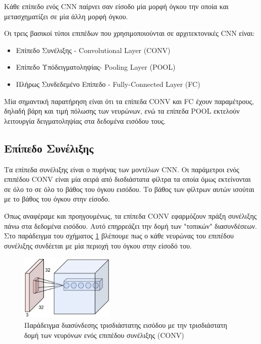 Κάθε επίπεδο ενός CNN παίρνει σαν είσοδο μία μορφή όγκου την οποία
και μετασχηματίζει σε μία άλλη μορφή όγκου.

Οι τρεις βασικοί τύποι επιπέδων που χρησιμοποιούνται σε αρχιτεκτονικές CNN είναι:
\begin{itemize}
  \item{Επίπεδο Συνέλιξης - Convolutional Layer (CONV)}
  \item{Επίπεδο Υπόδειγματοληψίας- Pooling Layer (POOL)}
  \item{Πλήρως Συνδεδεμένο Επίπεδο - Fully-Connected Layer (FC)}
\end{itemize}
Μία σημαντική παρατήρηση είναι ότι τα επίπεδα CONV και FC έχουν παραμέτρους, δηλαδή
βάρη και τιμή πόλωσης των νευρώνων, ενώ τα επίπεδα POOL εκτελούν λειτουργία
δειγματοληψίας στα δεδομένα εισόδου τους.

\subsection{Επίπεδο Συνέλιξης}

Τα επίπεδα συνέλιξης είναι ο πυρήνας των μοντέλων CNN. Οι παράμετροι ενός
επιπέδου CONV είναι μία σειρά από δισδιάστατα φίλτρα τα οποία όμως εκτείνονται
σε όλο το σε όλο το βάθος του όγκου εισόδου. Το βάθος των φίλτρων αυτών
ισούται με το βάθος του όγκου στην είσοδο.

Όπως αναφέραμε και προηγουμένως, τα επίπεδα CONV εφαρμόζουν πράξη συνέλιξης πάνω στα
δεδομένα εισόδου. Αυτό επηρρεάζει την δομή των "τοπικών" διασυνδέσεων.
Στο παράδειγμα του σχήματος \ref{fig:cnn_2} βλέπουμε πως ο κάθε νευρώνας
του επιπέδου συνέλιξης συνδέεται με μία περιοχή του όγκου στην είσοδό του.

\begin{figure}[!ht]
  \centering
  \includegraphics[width=0.4\textwidth]{./images/chapter3/cnn_2.jpg}
  \caption[%
    Παράδειγμα διασύνδεσης τρισδιάστατης εισόδου με την τρισδιάστατη δομή των
    νευρόνων ενός επιπέδου συνέλιξης (CONV)]{%
    Παράδειγμα διασύνδεσης τρισδιάστατης εισόδου με την τρισδιάστατη δομή των
    νευρόνων ενός επιπέδου συνέλιξης (CONV)}
  \label{fig:cnn_2}
\end{figure}

